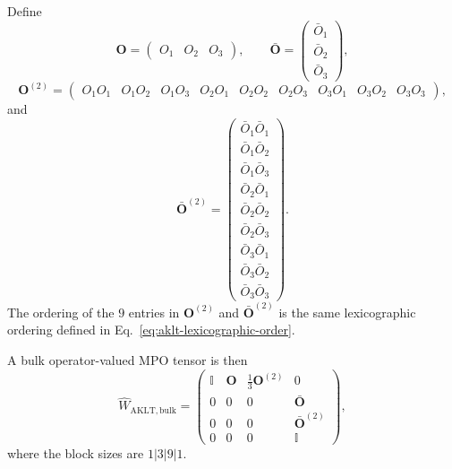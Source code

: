 \documentclass[aps,prb,onecolumn,nofootinbib]{revtex4-2}
\newcommand{\Id}{\mathbb{I}}
\begin{document}
	Define
	\begin{equation}
		\bm O
		=
		\begin{pmatrix}
			O_1 & O_2 & O_3
		\end{pmatrix},
		\qquad
		\bar{\bm O}
		=
		\begin{pmatrix}
			\bar O_1 \\ \bar O_2 \\ \bar O_3
		\end{pmatrix},
	\end{equation}
	\begin{equation}
		\bm O^{(2)}
		=
		\begin{pmatrix}
			O_1 O_1 &
			O_1 O_2 &
			O_1 O_3 &
			O_2 O_1 &
			O_2 O_2 &
			O_2 O_3 &
			O_3 O_1 &
			O_3 O_2 &
			O_3 O_3
		\end{pmatrix},
	\end{equation}
	and
	\begin{equation}
		\bar{\bm O}^{(2)}
		=
		\begin{pmatrix}
			\bar O_1 \bar O_1 \\
			\bar O_1 \bar O_2 \\
			\bar O_1 \bar O_3 \\
			\bar O_2 \bar O_1 \\
			\bar O_2 \bar O_2 \\
			\bar O_2 \bar O_3 \\
			\bar O_3 \bar O_1 \\
			\bar O_3 \bar O_2 \\
			\bar O_3 \bar O_3
		\end{pmatrix}.
	\end{equation}
	The ordering of the $9$ entries in $\bm O^{(2)}$ and $\bar{\bm O}^{(2)}$ is the same lexicographic ordering defined in Eq.~\eqref{eq:aklt-lexicographic-order}.
	
	A bulk operator-valued MPO tensor is then
	\begin{equation}
		\hat W_{\mathrm{AKLT,bulk}}
		=
		\begin{pmatrix}
			\Id & \bm O & \frac13 \bm O^{(2)} & 0 \\
			0 & 0 & 0 & \bar{\bm O} \\
			0 & 0 & 0 & \bar{\bm O}^{(2)} \\
			0 & 0 & 0 & \Id
		\end{pmatrix},
		\label{eq:aklt-mpo-block}
	\end{equation}
	where the block sizes are $1|3|9|1$.
	
\end{document}
